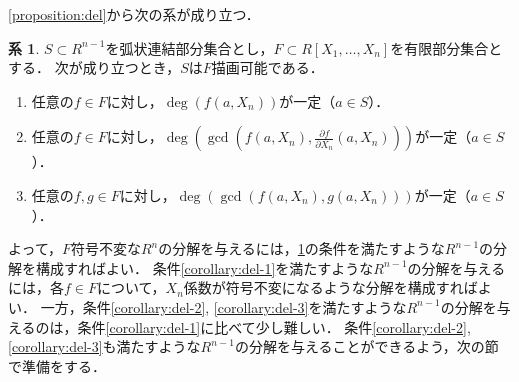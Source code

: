 \documentclass[uplatex, dvipdfmx]{jsarticle}
\numberwithin{equation}{section}
\theoremstyle{definition}
\newtheorem{corollary}[definition]{系}
\begin{document}
\cref{proposition:del}から次の系が成り立つ．

\begin{corollary}\label{corollary:del}
     $S \subset R^{n-1}$を弧状連結部分集合とし，$F \subset R[X_1,\dots, X_n]$を有限部分集合とする．
     次が成り立つとき，$S$は$F$描画可能である．
     \begin{enumerate}
          \item \label{corollary:del-1}
          任意の$f \in F$に対し，$\deg(f(a,X_n))$が一定（$a \in S$）．
          \item \label{corollary:del-2}
          任意の$f \in F$に対し，$\deg(\gcd(f(a,X_n), \frac{\partial f}{\partial X_n}(a,X_n)))$が一定（$a \in S$）．
          \item \label{corollary:del-3}
          任意の$f, g \in F$に対し，$\deg(\gcd(f(a,X_n), g(a,X_n)))$が一定（$a \in S$）．
     \end{enumerate}
\end{corollary}

よって，$F$符号不変な$R^n$の分解を与えるには，\cref{corollary:del}の条件を満たすような$R^{n-1}$の分解を構成すればよい．
条件\ref{corollary:del-1}を満たすような$R^{n-1}$の分解を与えるには，各$f \in F$について，$X_n$係数が符号不変になるような分解を構成すればよい．
一方，条件\ref{corollary:del-2}, \ref{corollary:del-3}を満たすような$R^{n-1}$の分解を与えるのは，条件\ref{corollary:del-1}に比べて少し難しい．
条件\ref{corollary:del-2}, \ref{corollary:del-3}も満たすような$R^{n-1}$の分解を与えることができるよう，次の節で準備をする．
\end{document}
